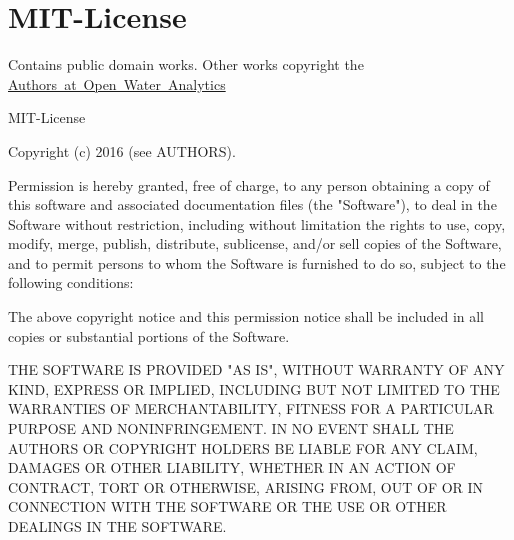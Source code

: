 \hypertarget{group___m_i_t-_license}{}\section{M\+I\+T-\/\+License}
\label{group___m_i_t-_license}
Contains public domain works. Other works copyright the \mbox{\hyperlink{group___a_u_t_h_o_r_s}{Authors at Open Water Analytics}}

\begin{DoxyVerb}MIT-License

Copyright (c) 2016 (see AUTHORS).

Permission is hereby granted, free of charge, to any person obtaining a copy
of this software and associated documentation files (the "Software"), to deal
in the Software without restriction, including without limitation the rights
to use, copy, modify, merge, publish, distribute, sublicense, and/or sell
copies of the Software, and to permit persons to whom the Software is
furnished to do so, subject to the following conditions:

The above copyright notice and this permission notice shall be included in all
copies or substantial portions of the Software.

THE SOFTWARE IS PROVIDED "AS IS", WITHOUT WARRANTY OF ANY KIND, EXPRESS OR
IMPLIED, INCLUDING BUT NOT LIMITED TO THE WARRANTIES OF MERCHANTABILITY,
FITNESS FOR A PARTICULAR PURPOSE AND NONINFRINGEMENT. IN NO EVENT SHALL THE
AUTHORS OR COPYRIGHT HOLDERS BE LIABLE FOR ANY CLAIM, DAMAGES OR OTHER
LIABILITY, WHETHER IN AN ACTION OF CONTRACT, TORT OR OTHERWISE, ARISING FROM,
OUT OF OR IN CONNECTION WITH THE SOFTWARE OR THE USE OR OTHER DEALINGS IN THE
SOFTWARE.
\end{DoxyVerb}
 